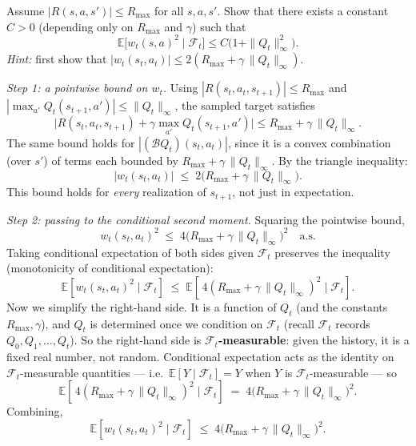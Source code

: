 \documentclass[11pt]{article}
\begin{document}
\begin{exercise}
\label{prob:noise_bounded_var} Assume $|R(s,a,s')| \le R_{\max}$ for all $s, a, s'$. Show that there exists a constant $C > 0$ (depending only on $R_{\max}$ and $\gamma$) such that
$$
\mathbb{E}\bigl[w_t(s,a)^2 \mid \mathcal{F}_t\bigr] \le C\bigl(1 + \|Q_t\|_\infty^2\bigr).
$$
\textit{Hint:} first show that $|w_t(s_t, a_t)| \le 2(R_{\max} + \gamma\, \|Q_t\|_\infty)$.
\end{exercise}

\begin{solution}
\emph{Step 1: a pointwise bound on $w_t$.} Using $|R(s_t, a_t, s_{t+1})| \le R_{\max}$ and $|\max_{a'} Q_t(s_{t+1}, a')| \le \|Q_t\|_\infty$, the sampled target satisfies
$$
\bigl|R(s_t, a_t, s_{t+1}) + \gamma \max_{a'} Q_t(s_{t+1}, a')\bigr| \le R_{\max} + \gamma\,\|Q_t\|_\infty.
$$
The same bound holds for $|(\mathcal{B}Q_t)(s_t, a_t)|$, since it is a convex combination (over $s'$) of terms each bounded by $R_{\max} + \gamma\,\|Q_t\|_\infty$. By the triangle inequality:
$$
|w_t(s_t, a_t)| \;\le\; 2\bigl(R_{\max} + \gamma\,\|Q_t\|_\infty\bigr).
$$
This bound holds for \emph{every} realization of $s_{t+1}$, not just in expectation.

\emph{Step 2: passing to the conditional second moment.} Squaring the pointwise bound,
$$
w_t(s_t, a_t)^2 \;\le\; 4\bigl(R_{\max} + \gamma\,\|Q_t\|_\infty\bigr)^2 \quad \text{a.s.}
$$
Taking conditional expectation of both sides given $\mathcal{F}_t$ preserves the inequality (monotonicity of conditional expectation):
$$
\mathbb{E}\!\left[w_t(s_t, a_t)^2 \mid \mathcal{F}_t\right]
\;\le\; \mathbb{E}\!\left[\,4(R_{\max} + \gamma\,\|Q_t\|_\infty)^2 \mid \mathcal{F}_t\right].
$$
Now we simplify the right-hand side. It is a function of $Q_t$ (and the constants $R_{\max}, \gamma$), and $Q_t$ is determined once we condition on $\mathcal{F}_t$ (recall $\mathcal{F}_t$ records $Q_0, Q_1, \ldots, Q_t$). So the right-hand side is \textbf{$\mathcal{F}_t$-measurable}: given the history, it is a fixed real number, not random. Conditional expectation acts as the identity on $\mathcal{F}_t$-measurable quantities --- i.e.\ $\mathbb{E}[Y \mid \mathcal{F}_t] = Y$ when $Y$ is $\mathcal{F}_t$-measurable --- so
$$
\mathbb{E}\!\left[\,4(R_{\max} + \gamma\,\|Q_t\|_\infty)^2 \mid \mathcal{F}_t\right]
\;=\; 4\bigl(R_{\max} + \gamma\,\|Q_t\|_\infty\bigr)^2.
$$
Combining,
$$
\mathbb{E}\!\left[w_t(s_t, a_t)^2 \mid \mathcal{F}_t\right]
\;\le\; 4\bigl(R_{\max} + \gamma\,\|Q_t\|_\infty\bigr)^2.
$$


\end{solution}
\end{document}
